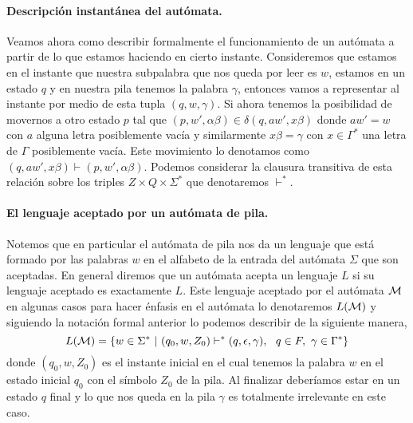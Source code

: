 \documentclass[tesis.tex]{subfiles}
\begin{document}
\paragraph{Descripción instantánea del autómata.} Veamos ahora como describir formalmente el funcionamiento de un autómata a partir de lo que estamos haciendo en cierto instante. 
Consideremos que estamos en el instante que nuestra subpalabra que nos queda por leer es $w$, estamos en un estado $q$ y en nuestra pila tenemos la palabra $\gamma$, entonces vamos a representar al instante por medio de esta tupla $(q,w,\gamma)$.
Si ahora tenemos la posibilidad de movernos a otro estado $p$ tal que $(p,w',\alpha\beta) \in \delta (q,aw',x\beta)$ donde $aw' = w$ con $a$ alguna letra posiblemente vacía y similarmente $x \beta = \gamma$ con $x \in \Gamma^*$ una letra de $\Gamma$ posiblemente vacía. 
Este movimiento lo denotamos como $(q,aw',x\beta) \vdash (p,w',\alpha \beta)$. 
Podemos considerar la clausura transitiva de esta relación sobre los triples $Z \times Q \times \Sigma^*$ que denotaremos $\vdash^*$.


\paragraph{El lenguaje aceptado por un autómata de pila.} 
Notemos que en particular el autómata de pila nos da un lenguaje que está formado por las palabras $w$ en el alfabeto de la entrada del autómata $\Sigma$ que son aceptadas. 
En general diremos que un autómata acepta un lenguaje $L$ si su lenguaje aceptado es exactamente $L$. 
Este lenguaje aceptado por el autómata $\cal M$ en algunas casos para hacer énfasis en el autómata lo denotaremos $L {(\cal M)}$ y siguiendo la notación formal anterior lo podemos describir de la siguiente manera,
\begin{equation*}
	L( {\cal M}) = \{ w \in \Sigma^* \ | \ (q_0,w,Z_0) \vdash^* (q, \epsilon, \gamma), \ \ q \in F, \ \gamma \in \Gamma^*      \}
\end{equation*}
donde $(q_0, w, Z_0)$ es el instante inicial en el cual tenemos la palabra $w$ en el estado inicial $q_0$ con el símbolo $Z_0$ de la pila. Al finalizar deberíamos estar en un estado $q$ final y lo que nos queda en la pila $\gamma$ es totalmente irrelevante en este caso.
\end{document}
